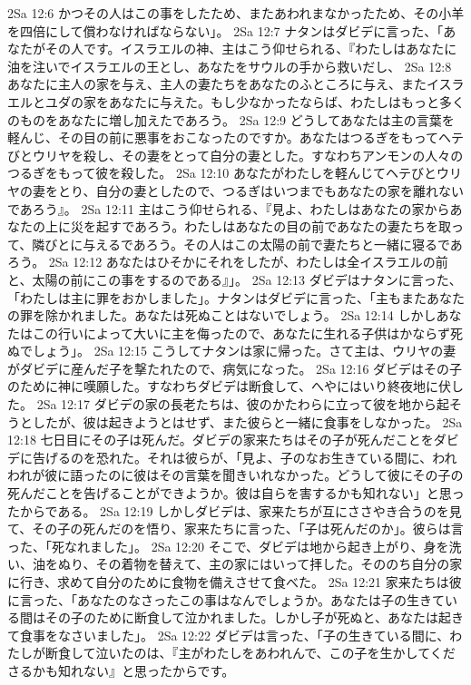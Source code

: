 2Sa 12:6  かつその人はこの事をしたため、またあわれまなかったため、その小羊を四倍にして償わなければならない」。
2Sa 12:7  ナタンはダビデに言った、「あなたがその人です。イスラエルの神、主はこう仰せられる、『わたしはあなたに油を注いでイスラエルの王とし、あなたをサウルの手から救いだし、
2Sa 12:8  あなたに主人の家を与え、主人の妻たちをあなたのふところに与え、またイスラエルとユダの家をあなたに与えた。もし少なかったならば、わたしはもっと多くのものをあなたに増し加えたであろう。
2Sa 12:9  どうしてあなたは主の言葉を軽んじ、その目の前に悪事をおこなったのですか。あなたはつるぎをもってヘテびとウリヤを殺し、その妻をとって自分の妻とした。すなわちアンモンの人々のつるぎをもって彼を殺した。
2Sa 12:10  あなたがわたしを軽んじてヘテびとウリヤの妻をとり、自分の妻としたので、つるぎはいつまでもあなたの家を離れないであろう』。
2Sa 12:11  主はこう仰せられる、『見よ、わたしはあなたの家からあなたの上に災を起すであろう。わたしはあなたの目の前であなたの妻たちを取って、隣びとに与えるであろう。その人はこの太陽の前で妻たちと一緒に寝るであろう。
2Sa 12:12  あなたはひそかにそれをしたが、わたしは全イスラエルの前と、太陽の前にこの事をするのである』」。
2Sa 12:13  ダビデはナタンに言った、「わたしは主に罪をおかしました」。ナタンはダビデに言った、「主もまたあなたの罪を除かれました。あなたは死ぬことはないでしょう。
2Sa 12:14  しかしあなたはこの行いによって大いに主を侮ったので、あなたに生れる子供はかならず死ぬでしょう」。
2Sa 12:15  こうしてナタンは家に帰った。さて主は、ウリヤの妻がダビデに産んだ子を撃たれたので、病気になった。
2Sa 12:16  ダビデはその子のために神に嘆願した。すなわちダビデは断食して、へやにはいり終夜地に伏した。
2Sa 12:17  ダビデの家の長老たちは、彼のかたわらに立って彼を地から起そうとしたが、彼は起きようとはせず、また彼らと一緒に食事をしなかった。
2Sa 12:18  七日目にその子は死んだ。ダビデの家来たちはその子が死んだことをダビデに告げるのを恐れた。それは彼らが、「見よ、子のなお生きている間に、われわれが彼に語ったのに彼はその言葉を聞きいれなかった。どうして彼にその子の死んだことを告げることができようか。彼は自らを害するかも知れない」と思ったからである。
2Sa 12:19  しかしダビデは、家来たちが互にささやき合うのを見て、その子の死んだのを悟り、家来たちに言った、「子は死んだのか」。彼らは言った、「死なれました」。
2Sa 12:20  そこで、ダビデは地から起き上がり、身を洗い、油をぬり、その着物を替えて、主の家にはいって拝した。そののち自分の家に行き、求めて自分のために食物を備えさせて食べた。
2Sa 12:21  家来たちは彼に言った、「あなたのなさったこの事はなんでしょうか。あなたは子の生きている間はその子のために断食して泣かれました。しかし子が死ぬと、あなたは起きて食事をなさいました」。
2Sa 12:22  ダビデは言った、「子の生きている間に、わたしが断食して泣いたのは、『主がわたしをあわれんで、この子を生かしてくださるかも知れない』と思ったからです。
